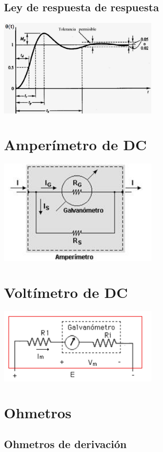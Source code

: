 \documentclass{report}
\begin{document}
\subsection{Ley de respuesta de respuesta}
\includegraphics[width=8cm]{../Assets/instrumentos_analogicos_ley_de_respuesta.png}


\section{Amperímetro de DC}
\includegraphics[width=8cm]{../Assets/amperimetro_galvanometro.jpg}


\section{Voltímetro de DC}
\includegraphics[width=8cm]{../Assets/voltimetro_galvanometro.png}

\section{Ohmetros}
\subsection{Ohmetros de derivación}
\end{document}
